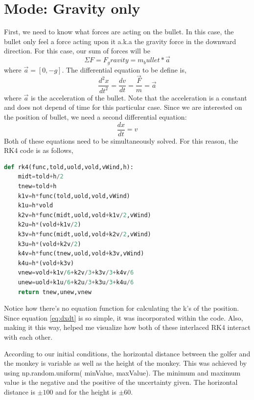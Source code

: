 
\section*{Mode: Gravity only}

First, we need to know what forces are acting on the bullet. In this case, the bullet only feel a force acting upon it a.k.a the gravity force in the downward direction. For this case, our sum of forces will be 
\begin{equation*}
    \Sigma F = F_gravity = m_bullet * \vec{a}
\end{equation*}
where $\vec{a}=[0,-g]$. The differential equation to be define is,
\begin{equation}
    \frac{d^2 x}{dt^2} = \frac{dv}{dt}= \frac{\vec{F}}{m} = \vec{a}
\end{equation}
where $\vec{a}$ is the acceleration of the bullet. Note that the acceleration is a constant and does not depend of time for this particular case. Since we are interested on the position of bullet, we need a second differential equation:
\begin{equation}
    \frac{dx}{dt} = v
    \label{eq:dxdt}
\end{equation}
Both of these equations need to be simultaneously solved. For this reason, the RK4 code is as follows,
\begin{lstlisting}[language=Python]
def rk4(func,told,uold,vold,vWind,h):
    midt=told+h/2
    tnew=told+h
    k1v=h*func(told,uold,vold,vWind)
    k1u=h*vold
    k2v=h*func(midt,uold,vold+k1v/2,vWind)
    k2u=h*(vold+k1v/2)
    k3v=h*func(midt,uold,vold+k2v/2,vWind)
    k3u=h*(vold+k2v/2)
    k4v=h*func(tnew,uold,vold+k3v,vWind)
    k4u=h*(vold+k3v)
    vnew=vold+k1v/6+k2v/3+k3v/3+k4v/6
    unew=uold+k1u/6+k2u/3+k3u/3+k4u/6
    return tnew,unew,vnew
\end{lstlisting}

Notice how there's no equation function for calculating the k's of the position. Since equation \ref{eq:dxdt} is so simple, it was incorporated within the code. Also, making it this way, helped me visualize how both of these interlaced RK4 interact with each other.

According to our initial conditions, the horizontal distance between the golfer and the monkey is variable as well as the height of the monkey. This was achieved by using np.random.uniform( minValue, maxValue). The minimum and maximum value is the negative and the positive of the uncertainty given. The horizontal distance is $\pm 100$ and for the height is $\pm 60$. 

